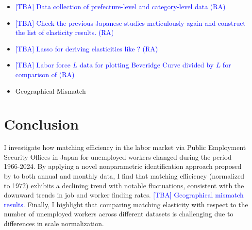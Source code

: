 \documentclass[12pt]{article}
\begin{document}
\begin{itemize}
    \item \textcolor{blue}{[TBA] Data collection of prefecture-level and category-level data (RA)}
    \item \textcolor{blue}{[TBA] Check the previous Japanese studies meticulously again and construct the list of elasticity results. (RA)}
    \item \textcolor{blue}{[TBA] Lasso for deriving elasticities like \cite{lange2020beyond}? (RA)}
    \item \textcolor{blue}{[TBA] Labor force $L$ data for plotting Beveridge Curve divided by $L$ for comparison of \cite{elsby2015beveridge} (RA)}
    \item Geographical Mismatch
\end{itemize}



\section{Conclusion}

I investigate how matching efficiency in the labor market via Public Employment Security Offices in Japan for unemployed workers changed during the period 1966-2024. By applying a novel nonparametric identification approach proposed by \cite{lange2020beyond} to both annual and monthly data, I find that matching efficiency (normalized to 1972) exhibits a declining trend with notable fluctuations, consistent with the downward trends in job and worker finding rates. \textcolor{blue}{[TBA] Geographical mismatch results.} Finally, I highlight that comparing matching elasticity with respect to the number of unemployed workers across different datasets is challenging due to differences in scale normalization.








\end{document}

